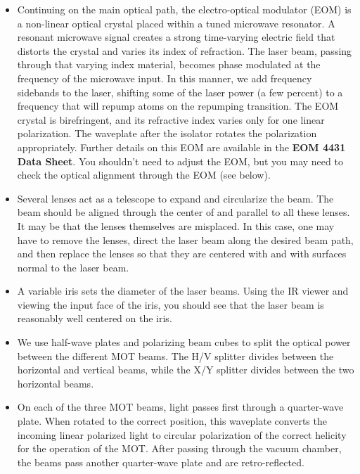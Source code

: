 \documentclass{../lab}
\begin{document}
\begin{itemize}
    \item Continuing on the main optical path, the electro-optical modulator (EOM) is a non-linear optical crystal placed within a tuned microwave resonator. A resonant microwave signal creates a strong time-varying electric field that distorts the crystal and varies its index of refraction. The laser beam, passing through that varying index material, becomes phase modulated at the frequency of the microwave input. In this manner, we add frequency sidebands to the laser, shifting some of the laser power (a few percent) to a frequency that will repump atoms on the repumping transition. The EOM crystal is birefringent, and its refractive index varies only for one linear polarization. The waveplate after the isolator rotates the polarization appropriately. Further details on this EOM are available in the \textbf{EOM 4431 Data Sheet}.  You shouldn't need to adjust the EOM, but you may need to check the optical alignment through the EOM (see below).

    \item Several lenses act as a telescope to expand and circularize the beam. The beam should be aligned through the center of and parallel to all these lenses.  It may be that the lenses themselves are misplaced.  In this case, one may have to remove the lenses, direct the laser beam along the desired beam path, and then replace the lenses so that they are centered with and with surfaces normal to the laser beam.

    \item A variable iris sets the diameter of the laser beams. Using the IR viewer and viewing the input face of the iris, you should see that the laser beam is reasonably well centered on the iris.

    \item We use half-wave plates and polarizing beam cubes to split the optical power between the different MOT beams. The H/V splitter divides between the horizontal and vertical beams, while the X/Y splitter divides between the two horizontal beams.

    \item On each of the three MOT beams, light passes first through a quarter-wave plate. When rotated to the correct position, this waveplate converts the incoming linear polarized light to circular polarization of the correct helicity for the operation of the MOT. After passing through the vacuum chamber, the beams pass another quarter-wave plate and are retro-reflected.


\end{itemize}
\end{document}
